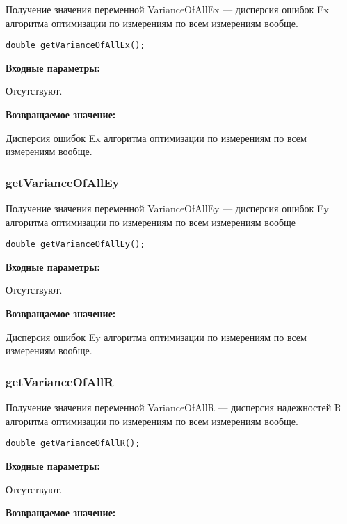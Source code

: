 \documentclass[a4paper,12pt]{article}
\begin{document}
Получение значения переменной VarianceOfAllEx --- дисперсия ошибок Ex алгоритма оптимизации по измерениям по всем измерениям вообще.


\begin{lstlisting}[label=code_syntax_getVarianceOfAllEx,caption=Синтаксис]
double getVarianceOfAllEx();
\end{lstlisting}

\textbf{Входные параметры:}

Отсутствуют.

\textbf{Возвращаемое значение:}

Дисперсия ошибок Ex алгоритма оптимизации по измерениям по всем измерениям вообще.


\subsubsection{getVarianceOfAllEy}\label{getVarianceOfAllEy}

Получение значения переменной VarianceOfAllEy --- дисперсия ошибок Ey алгоритма оптимизации по измерениям по всем измерениям вообще


\begin{lstlisting}[label=code_syntax_getVarianceOfAllEy,caption=Синтаксис]
double getVarianceOfAllEy();
\end{lstlisting}

\textbf{Входные параметры:}

Отсутствуют.

\textbf{Возвращаемое значение:}

Дисперсия ошибок Ey алгоритма оптимизации по измерениям по всем измерениям вообще.


\subsubsection{getVarianceOfAllR}\label{getVarianceOfAllR}

Получение значения переменной VarianceOfAllR --- дисперсия надежностей R алгоритма оптимизации по измерениям по всем измерениям вообще.


\begin{lstlisting}[label=code_syntax_getVarianceOfAllR,caption=Синтаксис]
double getVarianceOfAllR();
\end{lstlisting}

\textbf{Входные параметры:}

Отсутствуют.

\textbf{Возвращаемое значение:}
\end{document}
